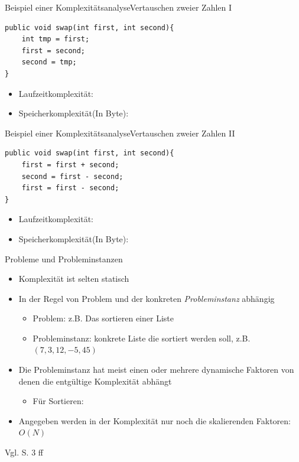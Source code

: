 \begin{frame}[fragile]{Beispiel einer Komplexitätsanalyse}{Vertauschen zweier Zahlen I}
\lstset{style=java}
\begin{lstlisting}
public void swap(int first, int second){
    int tmp = first;
    first = second;
    second = tmp;
}
\end{lstlisting}

\begin{itemize}
    \item Laufzeitkomplexität: 
    \item<3-> Speicherkomplexität(In Byte): 
\end{itemize}
\end{frame}

\begin{frame}[fragile]{Beispiel einer Komplexitätsanalyse}{Vertauschen zweier Zahlen II}
\lstset{style=java}
\begin{lstlisting}
public void swap(int first, int second){
    first = first + second;
    second = first - second;
    first = first - second;
}
\end{lstlisting}

\begin{itemize}
    \item Laufzeitkomplexität: 
    \item<3-> Speicherkomplexität(In Byte): 
\end{itemize}
\end{frame}

\begin{frame}{Probleme und Probleminstanzen}
    \begin{itemize}[<+->]
        \item Komplexität ist selten statisch
        \item In der Regel von Problem und der konkreten \textit{Probleminstanz} abhängig
        \begin{itemize}
            \item Problem: z.B. Das sortieren einer Liste
            \item Probleminstanz: konkrete Liste die sortiert werden soll, z.B. $(7, 3, 12, -5, 45)$
        \end{itemize}
        \item Die Probleminstanz hat meist einen oder mehrere dynamische Faktoren von denen die entgültige Komplexität abhängt
        \begin{itemize}
            \item Für Sortieren: 
        \end{itemize}
        \item Angegeben werden in der Komplexität nur noch die skalierenden Faktoren: $O(N)$
    \end{itemize}
    
    Vgl. \cite{ottmann2017} S. 3 ff
\end{frame}

